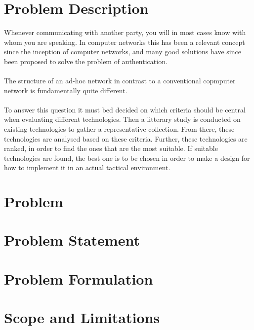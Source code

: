 \section{Problem Description}
\paragraph{} Whenever communicating with another party, you will in most cases know with whom you are speaking. In computer networks this has been a relevant concept since the inception of computer  networks, and many good solutions have since been proposed to solve the problem of authentication.

\paragraph{} The structure of an ad-hoc network in contrast to a conventional copmputer network is fundamentally quite different. 

\paragraph{} To answer this question it must bed decided on which criteria should be central when evaluating different technologies. Then a litterary study is conducted on existing technologies to gather a representative collection. From there, these technologies are analysed based on these criteria. Further, these technologies are ranked, in order to find the ones that are the most suitable. If suitable technologies are found, the best one is to be chosen in order to make a design for how to implement it in an actual tactical environment.

\section{Problem}

\section{Problem Statement}

\section{Problem Formulation}

\section{Scope and Limitations}

